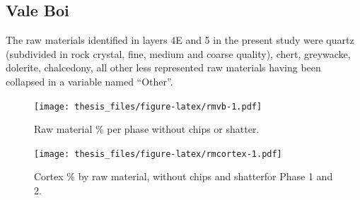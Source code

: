 \documentclass[12pt,twoside]{reedthesis}
\begin{document}
\hypertarget{vale-boi-1}{%
\subsection{Vale Boi}\label{vale-boi-1}}

The raw materials identified in layers 4E and 5 in the present study were quartz (subdivided in rock crystal, fine, medium and coarse quality), chert, greywacke, dolerite, chalcedony, all other less represented raw materials having been collapsed in a variable named ``Other''.
\begin{figure}
\centering
\texttt{[image: thesis\_files/figure-latex/rmvb-1.pdf]}
\caption{\label{fig:rmvb}Raw material \% per phase without chips or shatter.}
\end{figure}
\begin{figure}
\centering
\texttt{[image: thesis\_files/figure-latex/rmcortex-1.pdf]}
\caption{\label{fig:rmcortex}Cortex \% by raw material, without chips and shatterfor Phase 1 and 2.}
\end{figure}
\begin{table}

\caption{\label{tab:cortextab1}Cortex type and localization by raw material (Phase 1).}
\centering
{}
\end{table}
\end{document}
